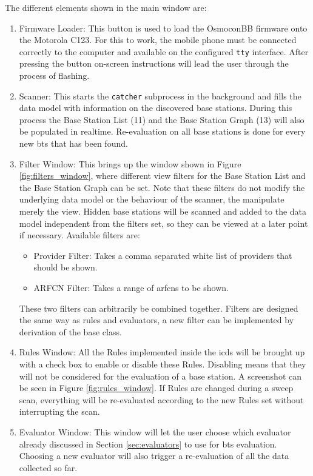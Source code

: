 The different elements shown in the main window are:
\begin{enumerate}
\item Firmware Loader: This button is used to load the OsmoconBB firmware onto the Motorola C123. 
For this to work, the mobile phone must be connected correctly to the computer and available on the configured \texttt{tty} interface.
After pressing the button on-screen instructions will lead the user through the process of flashing.

\item Scanner: This starts the \texttt{catcher} subprocess in the background and fills the data model with information on the discovered base stations.
During this process the Base Station List (11) and the Base Station Graph (13) will also be populated in realtime.
Re-evaluation on all base stations is done for every new \gls{bts} that has been found.

\item Filter Window: This brings up the window shown in Figure \ref{fig:filters_window}, where different view filters for the Base Station List and the Base Station Graph can be set.
Note that these filters do not modify the underlying data model or the behaviour of the scanner, the manipulate merely the view.
Hidden base stations will be scanned and added to the data model independent from the filters set, so they can be viewed at a later point if necessary.
Available filters are:
	\begin{itemize}
	\item Provider Filter: Takes a comma separated white list of providers that should be shown.
	\item ARFCN Filter: Takes a range of \glspl{arfcn} to be shown.
	\end{itemize}
These two filters can arbitrarily be combined together.
Filters are designed the same way as rules and evaluators, a new filter can be implemented by derivation of the base class.

\item Rules Window: All the Rules implemented inside the \gls{icds} will be brought up with a check box to enable or disable these Rules.
Disabling means that they will not be considered for the evaluation of a base station.
A screenshot can be seen in Figure \ref{fig:rules_window}.
If Rules are changed during a sweep scan, everything will be re-evaluated according to the new Rules set without interrupting the scan.

\item Evaluator Window: This window will let the user choose  which evaluator already discussed in Section \ref{sec:evaluators} to use for \gls{bts} evaluation.
Choosing a new evaluator will also trigger a re-evaluation of all the data collected so far.


\end{enumerate}
